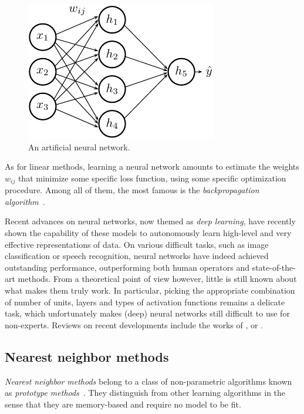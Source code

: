 \begin{figure}
    \centering
    \includegraphics[scale=1.0]{figures/ch2_mlp.pdf}
    \caption{An artificial neural network.}
    \label{fig:mlp}
\end{figure}

As for linear methods, learning a neural network  amounts to estimate the
weights $w_{ij}$ that minimize some specific loss function, using some specific
optimization procedure. Among all of them, the most famous is the
\textit{backpropagation algorithm}~\citep{bryson:1975}.

Recent advances on neural networks, now themed as \textit{deep learning}, have
recently shown the capability of these models to autonomously learn high-level
and very effective representations of data. On various difficult tasks, such as
image classification or speech recognition, neural networks have indeed
achieved outstanding performance, outperforming both human operators and
state-of-the-art methods. From a theoretical point of view however, little is
still known about what makes them truly work. In particular, picking the
appropriate combination of number of units, layers and types of activation
functions remains a delicate task, which unfortunately makes (deep) neural
networks still difficult to use for non-experts. Reviews on recent developments
include the works of \citet{hinton:2007}, \citet{arel:2010} or \citet{bengio:2013}.

\subsection{Nearest neighbor methods}

\textit{Nearest neighbor methods} belong to a class of non-parametric algorithms
known as \textit{prototype methods}~\citep{hastie:2005}. They distinguish from
other learning algorithms in the sense that they are memory-based and require
no model to be fit.

